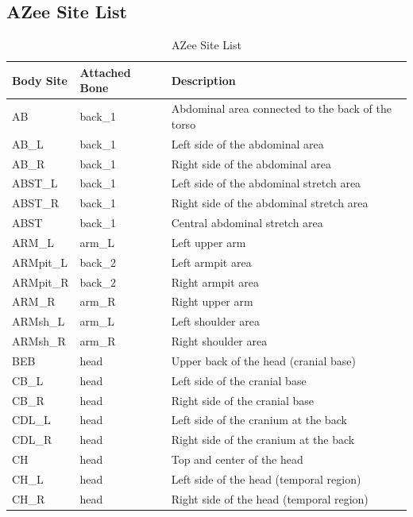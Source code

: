 \documentclass[../main.tex]{subfiles}
\begin{document}
\subsection{AZee Site List}
\label{annex:background_work:azee_sites}

\begin{longtable}{|p{2cm}|p{3cm}|p{5cm}|}
    \caption{AZee Site List} \label{tab:sites} \\
    \hline
    \textbf{Body Site} & \textbf{Attached Bone} & \textbf{Description} \\ \hline
    AB & back\_1 & Abdominal area connected to the back of the torso \\ \hline
    AB\_L & back\_1 & Left side of the abdominal area \\ \hline
    AB\_R & back\_1 & Right side of the abdominal area \\ \hline
    ABST\_L & back\_1 & Left side of the abdominal stretch area \\ \hline
    ABST\_R & back\_1 & Right side of the abdominal stretch area \\ \hline
    ABST & back\_1 & Central abdominal stretch area \\ \hline
    ARM\_L & arm\_L & Left upper arm \\ \hline
    ARMpit\_L & back\_2 & Left armpit area \\ \hline
    ARMpit\_R & back\_2 & Right armpit area \\ \hline
    ARM\_R & arm\_R & Right upper arm \\ \hline
    ARMsh\_L & arm\_L & Left shoulder area \\ \hline
    ARMsh\_R & arm\_R & Right shoulder area \\ \hline
    BEB & head & Upper back of the head (cranial base) \\ \hline
    CB\_L & head & Left side of the cranial base \\ \hline
    CB\_R & head & Right side of the cranial base \\ \hline
    CDL\_L & head & Left side of the cranium at the back \\ \hline
    CDL\_R & head & Right side of the cranium at the back \\ \hline
    CH & head & Top and center of the head \\ \hline
    CH\_L & head & Left side of the head (temporal region) \\ \hline
    CH\_R & head & Right side of the head (temporal region) \\ \hline

\end{longtable}
\end{document}
